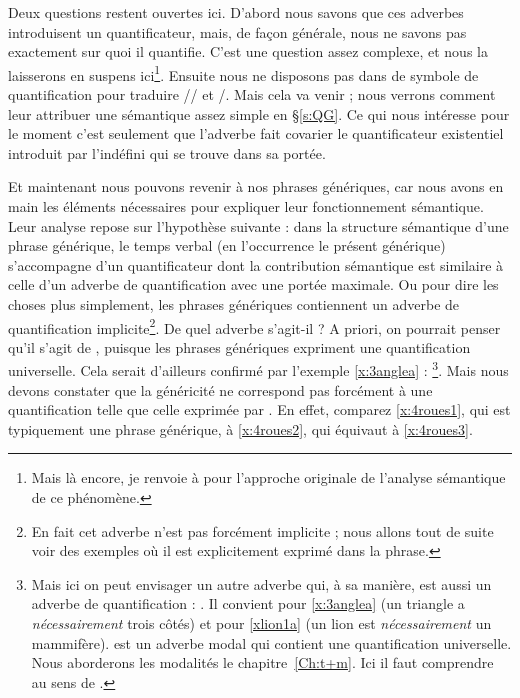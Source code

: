 Deux questions restent ouvertes ici. D'abord nous savons que ces
adverbes introduisent un quantificateur, mais, de façon générale, nous
ne savons pas exactement sur quoi il quantifie. C'est une question
assez complexe, et nous la laisserons en suspens ici\footnote{Mais là
  encore, je renvoie à \citet{Lewis:75} pour l'approche originale de
  l'analyse sémantique de ce phénomène.}.  Ensuite nous ne disposons
pas dans {\LO} de symbole de quantification pour traduire
// et
/.  Mais cela va venir ; nous verrons
comment leur attribuer une sémantique assez simple en \S\ref{s:QG}.  Ce qui nous intéresse pour le moment
c'est seulement que l'adverbe fait covarier le quantificateur
existentiel introduit par l'indéfini qui se trouve dans sa portée.

Et maintenant nous pouvons revenir à nos phrases génériques, car nous
avons en main les éléments nécessaires pour  expliquer leur
fonctionnement sémantique. 
Leur analyse repose sur l'hypothèse suivante : dans la structure
sémantique d'une phrase générique, le temps verbal (en l'occurrence le
présent générique) s'accompagne
d'un quantificateur dont la contribution sémantique est similaire à
celle d'un adverbe de quantification avec une
portée maximale.
Ou pour dire les choses plus simplement, les phrases génériques
contiennent un adverbe de 
quantification implicite\footnote{En fait cet adverbe n'est pas
  forcément implicite ; nous allons tout de suite voir des
exemples où il est explicitement exprimé dans la phrase.}.
De quel adverbe s'agit-il ? A priori, on pourrait penser qu'il s'agit
de , puisque les phrases génériques expriment une
quantification universelle. Cela serait d'ailleurs confirmé par
l'exemple \ref{x:3anglea} : \footnote{Mais ici on peut envisager un autre adverbe qui, à sa
manière, est aussi un adverbe de quantification :
. Il convient pour \ref{x:3anglea} (un triangle
a \emph{nécessairement} trois côtés) et pour \ref{xlion1a} (un lion
est \emph{nécessairement} un mammifère).  est un adverbe
  modal qui contient une quantification universelle. Nous aborderons
  les modalités le chapitre~\ref{Ch:t+m}. Ici il faut comprendre
   au sens de 
  .}.
Mais nous devons constater que la généricité ne correspond pas
forcément à une quantification telle que celle exprimée par
. En effet, comparez
\ref{x:4roues1}, qui est typiquement une phrase générique, à
\ref{x:4roues2}, qui équivaut à \ref{x:4roues3}.

